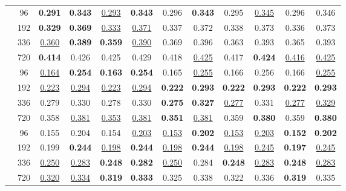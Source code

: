 \begin{table*}[h]
\begin{tabular}{c|c|cc|cc|cc|cc|cc}
	\midrule
	\multirow{4}{*}{\rotatebox[origin=c]{90}{\text{ETTm1}}}
		 & 96 &  \textbf{0.291} & \textbf{0.343} &  \underline{0.293} & \textbf{0.343} &  0.296 & \textbf{0.343} &  0.295 & \underline{0.345} &  0.296 & 0.346 \\
		 & 192 &  \textbf{0.329} & \textbf{0.369} &  \underline{0.333} & \underline{0.371} &  0.337 & 0.372 &  0.338 & 0.373 &  0.336 & 0.373 \\
		 & 336 &  \underline{0.360} & \textbf{0.389} &  \textbf{0.359} & \underline{0.390} &  0.369 & 0.396 &  0.363 & 0.393 &  0.365 & 0.393 \\
		 & 720 &  \textbf{0.414} & 0.426 &  0.425 & 0.429 &  0.418 & \underline{0.425} &  0.417 & \textbf{0.424} &  \underline{0.416} & \underline{0.425} \\ 
	\midrule
	\multirow{4}{*}{\rotatebox[origin=c]{90}{\text{ETTm2}}}
		 & 96 &  \underline{0.164} & \textbf{0.254} &  \textbf{0.163} & \textbf{0.254} &  0.165 & \underline{0.255} &  0.166 & 0.256 &  0.166 & \underline{0.255} \\
		 & 192 &  \underline{0.223} & \underline{0.294} &  \underline{0.223} & \underline{0.294} &  \textbf{0.222} & \textbf{0.293} &  \textbf{0.222} & \textbf{0.293} &  \textbf{0.222} & \textbf{0.293} \\
		 & 336 &  0.279 & 0.330 &  0.278 & 0.330 &  \textbf{0.275} & \textbf{0.327} &  \underline{0.277} & 0.331 &  \underline{0.277} & \underline{0.329} \\
		 & 720 &  0.358 & \underline{0.381} &  \underline{0.353} & \underline{0.381} &  \textbf{0.351} & \underline{0.381} &  0.359 & \textbf{0.380} &  0.359 & \textbf{0.380} \\ 
	\midrule
	\multirow{4}{*}{\rotatebox[origin=c]{90}{\text{Weather}}}
		 & 96 &  0.155 & 0.204 &  0.154 & \underline{0.203} &  \underline{0.153} & \textbf{0.202} &  \underline{0.153} & \underline{0.203} &  \textbf{0.152} & \textbf{0.202} \\
		 & 192 &  0.199 & \textbf{0.244} &  \underline{0.198} & \textbf{0.244} &  \underline{0.198} & \textbf{0.244} &  \underline{0.198} & \underline{0.245} &  \textbf{0.197} & \underline{0.245} \\
		 & 336 &  \underline{0.250} & \underline{0.283} &  \textbf{0.248} & \textbf{0.282} &  \underline{0.250} & 0.284 &  \textbf{0.248} & \underline{0.283} &  \textbf{0.248} & \underline{0.283} \\
		 & 720 &  \underline{0.320} & \underline{0.334} &  \textbf{0.319} & \textbf{0.333} &  0.325 & 0.338 &  0.322 & 0.336 &  \textbf{0.319} & 0.335 \\
        \bottomrule
    \end{tabular}
\end{table*}






